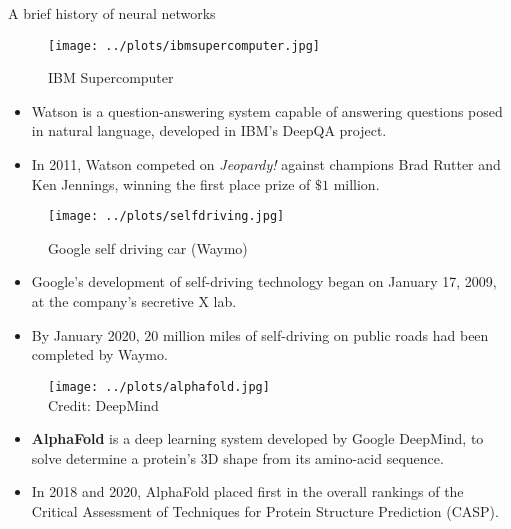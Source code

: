 \begin{vbframe}{A brief history of neural networks}
\begin{figure}
\centering
\texttt{[image: ../plots/ibmsupercomputer.jpg]}
\caption{IBM Supercomputer}
\end{figure}
\footnotesize
\begin{itemize}
\item Watson is a question-answering system capable of answering questions posed in natural language, developed in IBM's DeepQA project.
\vspace{.1cm}
\item In 2011, Watson competed on \textit{Jeopardy!} against champions Brad Rutter and Ken Jennings, winning the first place prize of $\$ 1$ million.
\end{itemize}
\framebreak

\begin{figure}
\centering
\texttt{[image: ../plots/selfdriving.jpg]}
\caption{Google self driving car (Waymo)}
\end{figure}
\footnotesize
\begin{itemize}
\item Google's development of self-driving technology began on January 17, 2009, at the company's secretive X lab.
\vspace{.1cm}
\item By January 2020, $20$ million miles of self-driving on public roads had been completed by Waymo.
\end{itemize}
\framebreak

\begin{figure}
\centering
\texttt{[image: ../plots/alphafold.jpg]}
\\
\tiny {Credit: DeepMind}
\end{figure}
\footnotesize
\begin{itemize}
\item\textbf{AlphaFold} is a deep learning system developed by Google DeepMind, to solve determine a protein's 3D shape from its amino-acid sequence.
\vspace{.1cm}
\item In 2018 and 2020, AlphaFold placed first in the overall rankings of the Critical Assessment of Techniques for Protein Structure Prediction (CASP).
\end{itemize}
\end{vbframe}

\endlecture
